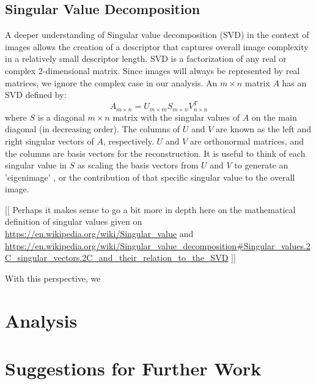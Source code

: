 \documentclass{report}
\begin{document}
\section{Singular Value Decomposition}
A deeper understanding of Singular value decomposition (SVD) in the context of images allows the creation of a descriptor that captures overall image complexity in a relatively small descriptor length. SVD is a factorization of any real or complex 2-dimensional matrix. Since images will always be represented by real matrices, we ignore the complex case in our analysis. An $m \times n$ matrix $A$ has an SVD defined by:
$$A_{\scriptscriptstyle m \times n} = U_{\scriptscriptstyle m \times m}S_{\scriptscriptstyle m \times n}V_{\scriptscriptstyle n \times n}^T$$
where $S$ is a diagonal $m \times n$ matrix with the singular values of $A$ on the main diagonal (in decreasing order). The columns of $U$ and $V$ are known as the left and right singular vectors of $A$, respectively. $U$ and $V$ are orthonormal matrices, and the columns are basis vectors for the reconstruction. It is useful to think of each singular value in $S$ as scaling the basis vectors from $U$ and $V$ to generate an 'eigenimage' \cite{svd_image_coding}, or the contribution of that specific singular value to the overall image.

[[ Perhaps it makes sense to go a bit more in depth here on the mathematical definition of singular values given on \url{https://en.wikipedia.org/wiki/Singular_value} and \url{https://en.wikipedia.org/wiki/Singular_value_decomposition#Singular_values.2C_singular_vectors.2C_and_their_relation_to_the_SVD}
]]

With this perspective, we 

\chapter{Analysis}

\chapter{Suggestions for Further Work}
\end{document}
